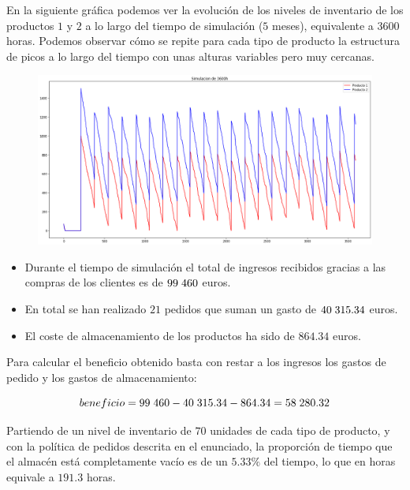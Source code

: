 \documentclass[a4paper,12pt]{article}
\begin{document}
	En la siguiente gráfica podemos ver la evolución de los niveles de inventario de los productos $1$
y $2$ a lo largo del tiempo de simulación ($5$ meses), equivalente a $3600$ horas. Podemos
observar cómo se repite para cada tipo de producto la estructura de picos a lo largo del tiempo
con unas alturas variables pero muy cercanas.
	\begin{figure}[H]
		\centering
		\includegraphics[width=\textwidth]{include/simulacion_5m_ancha.png}
	\end{figure}

	\begin{itemize}
		\item Durante el tiempo de simulación el total de ingresos recibidos gracias a las compras de
	los clientes es de $99\hspace{1mm}460$ euros.

		\item En total se han realizado $21$ pedidos que suman un gasto de $40\hspace{1mm}315.34$ euros.

		\item El coste de almacenamiento de los productos ha sido de $864.34$ euros.
	\end{itemize}

	Para calcular el beneficio obtenido basta con restar a los ingresos los gastos de pedido y los gastos
de almacenamiento:

	$$beneficio = 99\hspace{1mm}460 - 40\hspace{1mm}315.34 - 864.34 = 58\hspace{1mm}280.32$$
	
	
	Partiendo de un nivel de inventario de $70$ unidades de cada tipo de producto, y con la política de
pedidos descrita en el enunciado, la proporción de tiempo que el almacén está completamente
vacío es de un $5.33\%$ del tiempo, lo que en horas equivale a $191.3$ horas.
\end{document}
